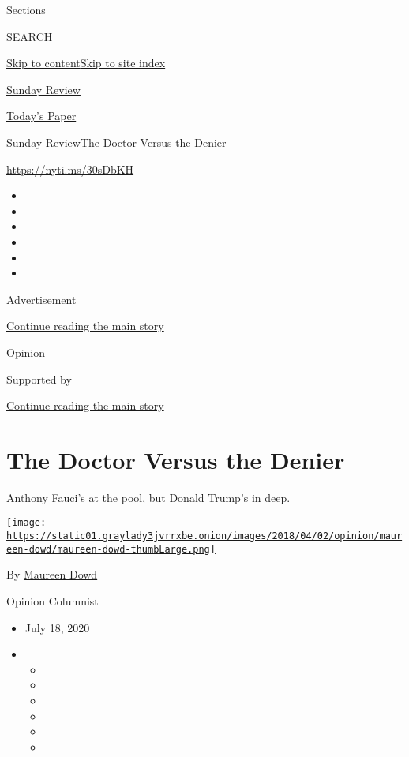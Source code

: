 Sections

SEARCH

\protect\hyperlink{site-content}{Skip to
content}\protect\hyperlink{site-index}{Skip to site index}

\href{https://www.nytimes3xbfgragh.onion/section/opinion/sunday}{Sunday
Review}

\href{https://myaccount.nytimes3xbfgragh.onion/auth/login?response_type=cookie\&client_id=vi}{}

\href{https://www.nytimes3xbfgragh.onion/section/todayspaper}{Today's
Paper}

\href{/section/opinion/sunday}{Sunday Review}\textbar{}The Doctor Versus
the Denier

\href{https://nyti.ms/30sDbKH}{https://nyti.ms/30sDbKH}

\begin{itemize}
\item
\item
\item
\item
\item
\item
\end{itemize}

Advertisement

\protect\hyperlink{after-top}{Continue reading the main story}

\href{/section/opinion}{Opinion}

Supported by

\protect\hyperlink{after-sponsor}{Continue reading the main story}

\hypertarget{the-doctor-versus-the-denier}{%
\section{The Doctor Versus the
Denier}\label{the-doctor-versus-the-denier}}

Anthony Fauci's at the pool, but Donald Trump's in deep.

\href{https://www.nytimes3xbfgragh.onion/by/maureen-dowd}{\texttt{[image: https://static01.graylady3jvrrxbe.onion/images/2018/04/02/opinion/maureen-dowd/maureen-dowd-thumbLarge.png]}}

By \href{https://www.nytimes3xbfgragh.onion/by/maureen-dowd}{Maureen
Dowd}

Opinion Columnist

\begin{itemize}
\item
  July 18, 2020
\item
  \begin{itemize}
  \item
  \item
  \item
  \item
  \item
  \item
  \end{itemize}
\end{itemize}

